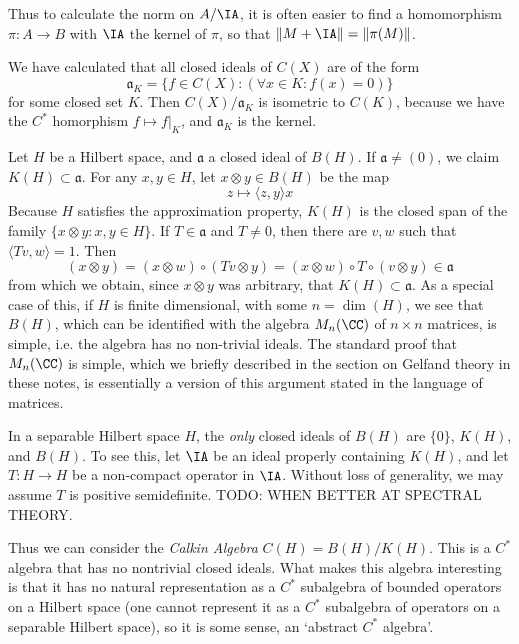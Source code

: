 Thus to calculate the norm on $A/\IA$, it is often easier to find a homomorphism $\pi: A \to B$ with $\IA$ the kernel of $\pi$, so that $\| M + \IA \| = \| \pi(M) \|$.

\begin{example}
    We have calculated that all closed ideals of $C(X)$ are of the form
    \[ \mathfrak{a}_K = \{ f \in C(X) : (\forall x \in K: f(x) = 0) \} \]
    for some closed set $K$. Then $C(X)/\mathfrak{a}_K$ is isometric to $C(K)$, because we have the $C^*$ homorphism $f \mapsto f|_K$, and $\mathfrak{a}_K$ is the kernel.
\end{example}

\begin{example}
    Let $H$ be a Hilbert space, and $\mathfrak{a}$ a closed ideal of $B(H)$. If $\mathfrak{a} \neq (0)$, we claim $K(H) \subset \mathfrak{a}$. For any $x,y \in H$, let $x \otimes y \in B(H)$ be the map
    \[ z \mapsto \langle z, y \rangle x \]
    Because $H$ satisfies the approximation property, $K(H)$ is the closed span of the family $\{ x \otimes y: x,y \in H \}$. If $T \in \mathfrak{a}$ and $T \neq 0$, then there are $v,w$ such that $\langle Tv, w \rangle = 1$. Then
    \[ (x \otimes y) = (x \otimes w) \circ (Tv \otimes y) = (x \otimes w) \circ T \circ (v \otimes y) \in \mathfrak{a} \]
    from which we obtain, since $x \otimes y$ was arbitrary, that $K(H) \subset \mathfrak{a}$. As a special case of this, if $H$ is finite dimensional, with some $n = \dim(H)$, we see that $B(H)$, which can be identified with the algebra $M_n(\CC)$ of $n \times n$ matrices, is simple, i.e. the algebra has no non-trivial ideals. The standard proof that $M_n(\CC)$ is simple, which we briefly described in the section on Gelfand theory in these notes, is essentially a version of this argument stated in the language of matrices.

    In a separable Hilbert space $H$, the \emph{only} closed ideals of $B(H)$ are $\{ 0 \}$, $K(H)$, and $B(H)$. To see this, let $\IA$ be an ideal properly containing $K(H)$, and let $T: H \to H$ be a non-compact operator in $\IA$. Without loss of generality, we may assume $T$ is positive semidefinite. TODO: WHEN BETTER AT SPECTRAL THEORY.

    Thus we can consider the \emph{Calkin Algebra} $C(H) = B(H)/K(H)$. This is a $C^*$ algebra that has no nontrivial closed ideals. What makes this algebra interesting is that it has no natural representation as a $C^*$ subalgebra of bounded operators on a Hilbert space (one cannot represent it as a $C^*$ subalgebra of operators on a separable Hilbert space), so it is some sense, an `abstract $C^*$ algebra'.
\end{example}



